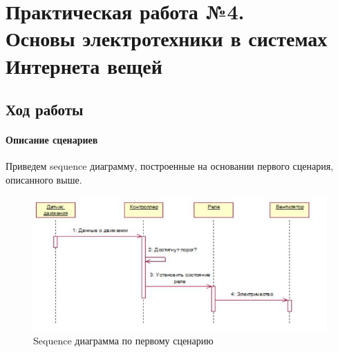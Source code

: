 \documentclass[a4paper,14pt]{extarticle}
\begin{document}
\section{Практическая работа №4. \\Основы электротехники в системах\\Интернета вещей}
\subsection{Ход работы}
\paragraph{Описание сценариев} Приведем sequence диаграмму, построенные на основании первого сценария, описанного выше.
\begin{figure}[htbp]
	\centering
	\includegraphics[width=0.7\linewidth]{images/deploy-scheme}
	\caption{Sequence диаграмма по первому сценарию}
	\label{fig:deploy-scheme}
\end{figure}
\end{document}
